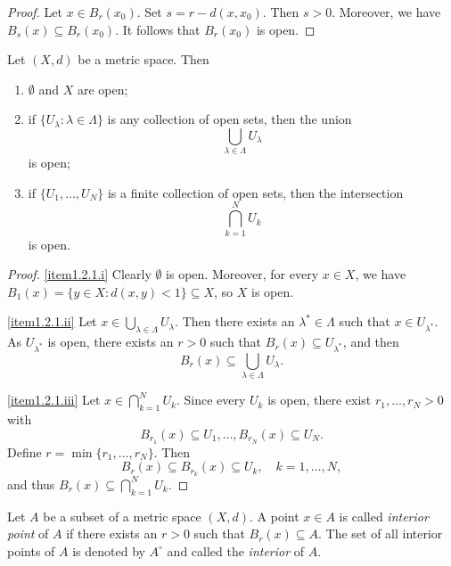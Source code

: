 \begin{proof}
Let $x \in B_r(x_0)$. Set $s = r - d(x,x_0)$. Then $s > 0$. Moreover, we have $B_s(x) \subseteq B_r(x_0)$. It follows that $B_r(x_0)$ is open.
\end{proof}

\np

\begin{theorem} \label{thm:open}
Let $(X,d)$ be a metric space. Then
\begin{enumerate}
\item \label{item1.2.1.i} $\emptyset$ and $X$ are open;
\item \label{item1.2.1.ii} if $\{U_\lambda: \lambda \in \Lambda\}$ is any collection of open sets, then the union
\[
\bigcup_{\lambda \in \Lambda} U_\lambda
\]
is open;
\item \label{item1.2.1.iii} if $\{U_1, \ldots, U_N\}$ is a finite collection of open sets, then the intersection
\[
\bigcap_{k = 1}^N U_k
\]
is open.
\end{enumerate}
\end{theorem}

\begin{proof}
\eqref{item1.2.1.i} Clearly $\emptyset$ is open. Moreover, for every $x \in X$, we have
$B_1(x)=\{y \in X: d(x,y) < 1\} \subseteq X$, so $X$ is open.
\medskip

\eqref{item1.2.1.ii} Let $x \in \bigcup_{\lambda \in \Lambda} U_\lambda$. Then there exists an $\lambda^\ast \in \Lambda$ such
that $x \in U_{\lambda^\ast}$. As $U_{\lambda^\ast}$ is open, there exists an $r > 0$ such that $B_r(x) \subseteq U_{\lambda^\ast}$, and
then
\[
B_r(x) \subseteq \bigcup_{\lambda \in \Lambda} U_\lambda.
\]
\medskip

\eqref{item1.2.1.iii} Let $x \in \bigcap_{k = 1}^N U_k$. Since every $U_k$ is open, there exist
$r_1,\ldots,r_N > 0$ with
\[
B_{r_1}(x) \subseteq U_1, \ldots, B_{r_N}(x) \subseteq U_N.
\]
Define $r = \min\{r_1,\ldots,r_N\}$. Then
\[
B_r(x) \subseteq B_{r_k}(x) \subseteq U_k, \quad k = 1,\ldots,N,
\]
and thus $B_r(x) \subseteq \bigcap_{k = 1}^N U_k$.
\end{proof}

\np

\begin{definition}[Interior]
Let $A$ be a subset of a metric space $(X,d)$. A point $x \in A$ is called \emph{interior point} 
of $A$ if there exists an $r > 0$ such that $B_r(x) \subseteq A$.
The set of all interior points of $A$ is denoted by $A^\circ$ and called the
\emph{interior} of $A$.
\end{definition}

